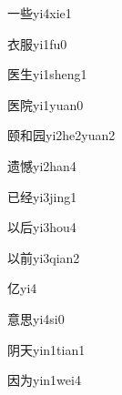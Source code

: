 \begin{verbete}[1;8]{一些}{yi4xie1}
\end{verbete}

\begin{verbete}[6;8]{衣服}{yi1fu0}
\end{verbete}

\begin{verbete}[7;5]{医生}{yi1sheng1}
\end{verbete}

\begin{verbete}[7;9]{医院}{yi1yuan0}
\end{verbete}

\begin{verbete}[13;8;7]{颐和园}{yi2he2yuan2}
\end{verbete}

\begin{verbete}[12;16]{遗憾}{yi2han4}
\end{verbete}

\begin{verbete}[3;8]{已经}{yi3jing1}
\end{verbete}

\begin{verbete}[4;6]{以后}{yi3hou4}
\end{verbete}

\begin{verbete}[4;9]{以前}{yi3qian2}
\end{verbete}

\begin{verbete}[3]{亿}{yi4}
\end{verbete}

\begin{verbete}[13;9]{意思}{yi4si0}
\end{verbete}

\begin{verbete}[6;4]{阴天}{yin1tian1}
\end{verbete}

\begin{verbete}[6;4]{因为}{yin1wei4}
\end{verbete}


